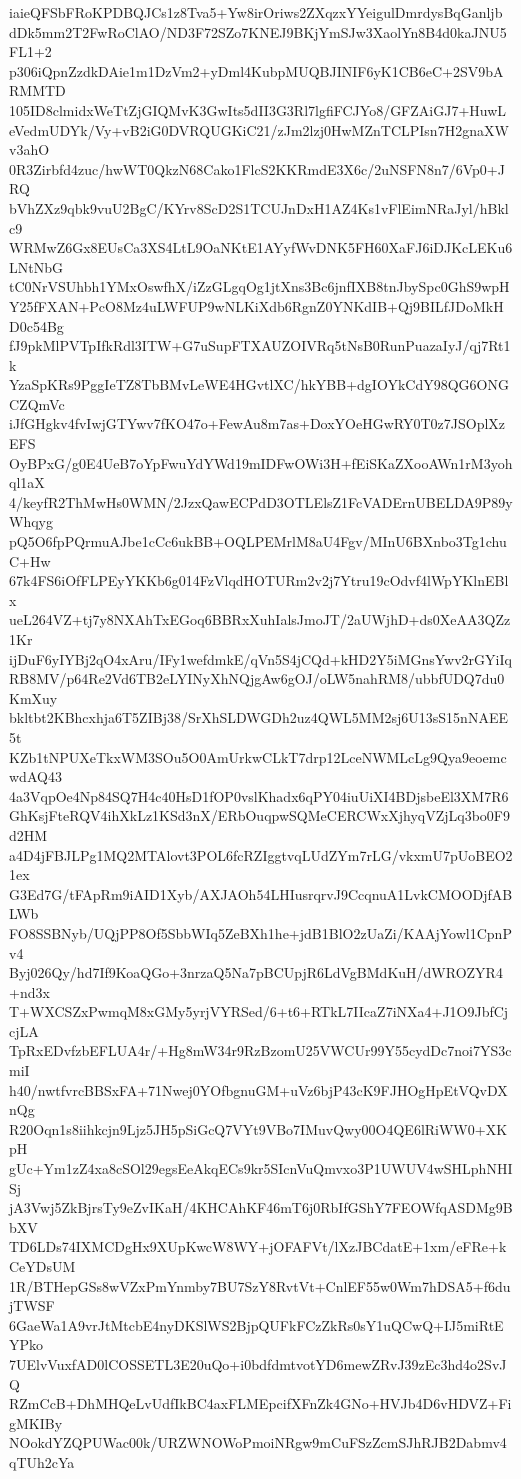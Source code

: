 iaieQFSbFRoKPDBQJCs1z8Tva5+Yw8irOriws2ZXqzxYYeigulDmrdysBqGanljb
dDk5mm2T2FwRoClAO/ND3F72SZo7KNEJ9BKjYmSJw3XaolYn8B4d0kaJNU5FL1+2
p306iQpnZzdkDAie1m1DzVm2+yDml4KubpMUQBJINIF6yK1CB6eC+2SV9bARMMTD
105ID8clmidxWeTtZjGIQMvK3GwIts5dII3G3Rl7lgfiFCJYo8/GFZAiGJ7+HuwL
eVedmUDYk/Vy+vB2iG0DVRQUGKiC21/zJm2lzj0HwMZnTCLPIsn7H2gnaXWv3ahO
0R3Zirbfd4zuc/hwWT0QkzN68Cako1FlcS2KKRmdE3X6c/2uNSFN8n7/6Vp0+JRQ
bVhZXz9qbk9vuU2BgC/KYrv8ScD2S1TCUJnDxH1AZ4Ks1vFlEimNRaJyl/hBklc9
WRMwZ6Gx8EUsCa3XS4LtL9OaNKtE1AYyfWvDNK5FH60XaFJ6iDJKcLEKu6LNtNbG
tC0NrVSUhbh1YMxOswfhX/iZzGLgqOg1jtXns3Bc6jnfIXB8tnJbySpc0GhS9wpH
Y25fFXAN+PcO8Mz4uLWFUP9wNLKiXdb6RgnZ0YNKdIB+Qj9BILfJDoMkHD0c54Bg
fJ9pkMlPVTpIfkRdl3ITW+G7uSupFTXAUZOIVRq5tNsB0RunPuazaIyJ/qj7Rt1k
YzaSpKRs9PggIeTZ8TbBMvLeWE4HGvtlXC/hkYBB+dgIOYkCdY98QG6ONGCZQmVc
iJfGHgkv4fvIwjGTYwv7fKO47o+FewAu8m7as+DoxYOeHGwRY0T0z7JSOplXzEFS
OyBPxG/g0E4UeB7oYpFwuYdYWd19mIDFwOWi3H+fEiSKaZXooAWn1rM3yohql1aX
4/keyfR2ThMwHs0WMN/2JzxQawECPdD3OTLElsZ1FcVADErnUBELDA9P89yWhqyg
pQ5O6fpPQrmuAJbe1cCc6ukBB+OQLPEMrlM8aU4Fgv/MInU6BXnbo3Tg1chuC+Hw
67k4FS6iOfFLPEyYKKb6g014FzVlqdHOTURm2v2j7Ytru19cOdvf4lWpYKlnEBlx
ueL264VZ+tj7y8NXAhTxEGoq6BBRxXuhIalsJmoJT/2aUWjhD+ds0XeAA3QZz1Kr
ijDuF6yIYBj2qO4xAru/IFy1wefdmkE/qVn5S4jCQd+kHD2Y5iMGnsYwv2rGYiIq
RB8MV/p64Re2Vd6TB2eLYINyXhNQjgAw6gOJ/oLW5nahRM8/ubbfUDQ7du0KmXuy
bkltbt2KBhcxhja6T5ZIBj38/SrXhSLDWGDh2uz4QWL5MM2sj6U13sS15nNAEE5t
KZb1tNPUXeTkxWM3SOu5O0AmUrkwCLkT7drp12LceNWMLcLg9Qya9eoemcwdAQ43
4a3VqpOe4Np84SQ7H4c40HsD1fOP0vslKhadx6qPY04iuUiXI4BDjsbeEl3XM7R6
GhKsjFteRQV4ihXkLz1KSd3nX/ERbOuqpwSQMeCERCWxXjhyqVZjLq3bo0F9d2HM
a4D4jFBJLPg1MQ2MTAlovt3POL6fcRZIggtvqLUdZYm7rLG/vkxmU7pUoBEO21ex
G3Ed7G/tFApRm9iAID1Xyb/AXJAOh54LHIusrqrvJ9CcqnuA1LvkCMOODjfABLWb
FO8SSBNyb/UQjPP8Of5SbbWIq5ZeBXh1he+jdB1BlO2zUaZi/KAAjYowl1CpnPv4
Byj026Qy/hd7If9KoaQGo+3nrzaQ5Na7pBCUpjR6LdVgBMdKuH/dWROZYR4+nd3x
T+WXCSZxPwmqM8xGMy5yrjVYRSed/6+t6+RTkL7IIcaZ7iNXa4+J1O9JbfCjcjLA
TpRxEDvfzbEFLUA4r/+Hg8mW34r9RzBzomU25VWCUr99Y55cydDc7noi7YS3cmiI
h40/nwtfvrcBBSxFA+71Nwej0YOfbgnuGM+uVz6bjP43cK9FJHOgHpEtVQvDXnQg
R20Oqn1s8iihkcjn9Ljz5JH5pSiGcQ7VYt9VBo7IMuvQwy00O4QE6lRiWW0+XKpH
gUc+Ym1zZ4xa8cSOl29egsEeAkqECs9kr5SIcnVuQmvxo3P1UWUV4wSHLphNHISj
jA3Vwj5ZkBjrsTy9eZvIKaH/4KHCAhKF46mT6j0RbIfGShY7FEOWfqASDMg9BbXV
TD6LDs74IXMCDgHx9XUpKwcW8WY+jOFAFVt/lXzJBCdatE+1xm/eFRe+kCeYDsUM
1R/BTHepGSs8wVZxPmYnmby7BU7SzY8RvtVt+CnlEF55w0Wm7hDSA5+f6dujTWSF
6GaeWa1A9vrJtMtcbE4nyDKSlWS2BjpQUFkFCzZkRs0sY1uQCwQ+IJ5miRtEYPko
7UElvVuxfAD0lCOSSETL3E20uQo+i0bdfdmtvotYD6mewZRvJ39zEc3hd4o2SvJQ
RZmCcB+DhMHQeLvUdfIkBC4axFLMEpcifXFnZk4GNo+HVJb4D6vHDVZ+FigMKIBy
NOokdYZQPUWac00k/URZWNOWoPmoiNRgw9mCuFSzZcmSJhRJB2Dabmv4qTUh2cYa
